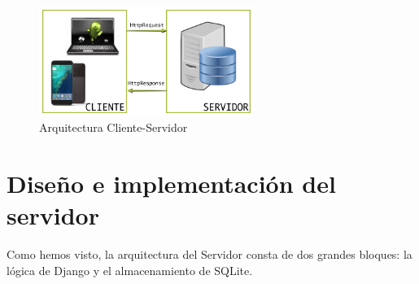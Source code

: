 \documentclass[a4paper, 12pt]{book}
\begin{document}
\begin{figure}[H]
  \centering
  \includegraphics[width=7cm, keepaspectratio]{img/arquitectura}
  \caption{Arquitectura Cliente-Servidor}
  \label{fig:arquitectura}
\end{figure}

\section{Diseño e implementación del servidor} 
\label{sec:arquitecturaServidor}
Como hemos visto, la arquitectura del Servidor consta de dos grandes bloques: la lógica de Django y el almacenamiento de SQLite.  
\end{document}
